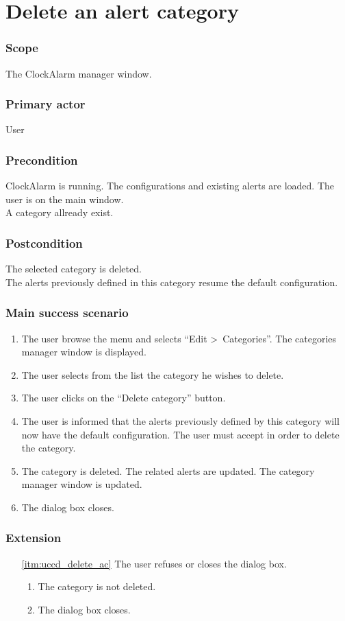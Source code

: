 \section{Delete an alert category}\label{subsec:usecase_delete_category}

\subsubsection{Scope}
The ClockAlarm manager window.
\subsubsection{Primary actor}
User
\subsubsection{Precondition}
ClockAlarm is running. The configurations and existing alerts are loaded. The user is on the main window.
\\A category allready exist.
\subsubsection{Postcondition}
The selected category is deleted.\\The alerts previously defined in this category resume the default configuration.
\subsubsection{Main success scenario}
\begin{enumerate}
	\item The user browse the menu and selects ``Edit \textgreater~Categories''. The categories manager window is displayed. 
	\item The user selects from the list the category he wishes to delete.
	\item The user clicks on the ``Delete category'' button.
	\item\label{itm:uccd_delete_ac} The user is informed that the alerts previously defined by this category will now have the default configuration. The user must accept in order to delete the category.
	\item The category is deleted. The related alerts are updated. The category manager window is updated. 
	\item The dialog box closes.
\end{enumerate}
\subsubsection{Extension}
\begin{enumerate}
	\item[\ref{itm:uccd_delete_ac}] The user refuses or closes the dialog box.
	\begin{enumerate}[i]
		\item The category is not deleted.
		\item The dialog box closes.
	\end{enumerate}
\end{enumerate}
